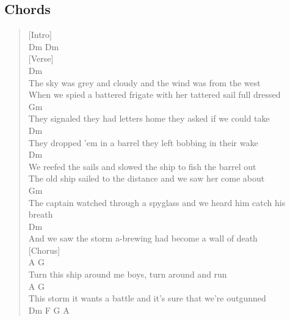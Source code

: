 \documentclass[11pt]{article}
\begin{document}
\subsection{Chords}
\label{sec:org0aece12}
\begin{verse}
[Intro]\\
Dm Dm\\
\vspace*{1em}
[Verse]\\
Dm\\
The sky was grey and cloudy and the wind was from the west\\
\vspace*{1em}
When we spied a battered frigate with her tattered sail full dressed\\
\vspace*{1em}
Gm\\
They signaled they had letters home they asked if we could take\\
\vspace*{1em}
Dm\\
They dropped 'em in a barrel they left bobbing in their wake\\
\vspace*{1em}
\vspace*{1em}
Dm\\
We reefed the sails and slowed the ship to fish the barrel out\\
\vspace*{1em}
The old ship sailed to the distance and we saw her come about\\
\vspace*{1em}
Gm\\
The captain watched through a spyglass and we heard him catch his breath\\
\vspace*{1em}
Dm\\
And we saw the storm a-brewing had become a wall of death\\
\vspace*{1em}
[Chorus]\\
A                              G\\
Turn this ship around me boys, turn around and run\\
\vspace*{1em}
A                                     G\\
This storm it wants a battle and it's sure that we're outgunned\\
\vspace*{1em}
Dm                       F               G                A\\

\end{verse}
\end{document}
